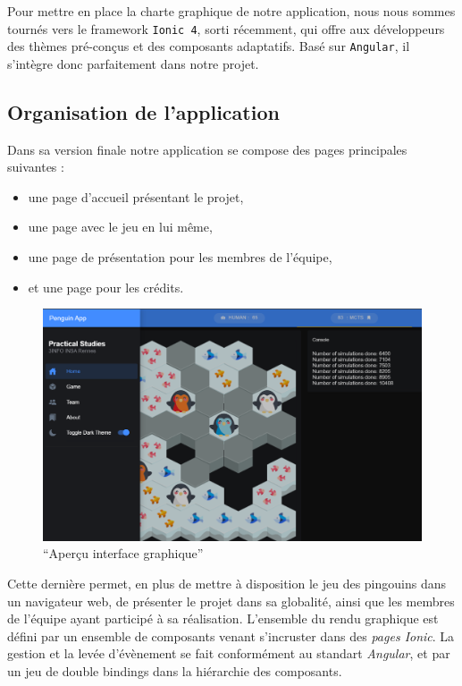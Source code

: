 \documentclass[a4paper,11pt]{article}
\providecommand{\tightlist}{%
  \setlength{\itemsep}{0pt}\setlength{\parskip}{0pt}}
\begin{document}
Pour mettre en place la charte graphique de notre application, nous nous
sommes tournés vers le framework \texttt{Ionic\ 4}, sorti récemment, qui
offre aux développeurs des thèmes pré-conçus et des composants
adaptatifs. Basé sur \texttt{Angular}, il s'intègre donc parfaitement
dans notre projet.

\subsection{Organisation de
l'application}\label{organisation-de-lapplication}

Dans sa version finale notre application se compose des pages
principales suivantes :

\begin{itemize}
\tightlist
\item
  une page d'accueil présentant le projet,
\item
  une page avec le jeu en lui même,
\item
  une page de présentation pour les membres de l'équipe,
\item
  et une page pour les crédits.
\end{itemize}

\begin{figure}
\centering
\includegraphics{penguinApp.png}
\caption{``Aperçu interface graphique''}
\end{figure}

Cette dernière permet, en plus de mettre à disposition le jeu des
pingouins dans un navigateur web, de présenter le projet dans sa
globalité, ainsi que les membres de l'équipe ayant participé à sa
réalisation. L'ensemble du rendu graphique est défini par un ensemble de
composants venant s'incruster dans des \emph{pages Ionic}. La gestion et
la levée d'évènement se fait conformément au standart \emph{Angular}, et
par un jeu de double bindings dans la hiérarchie des composants.
\end{document}
